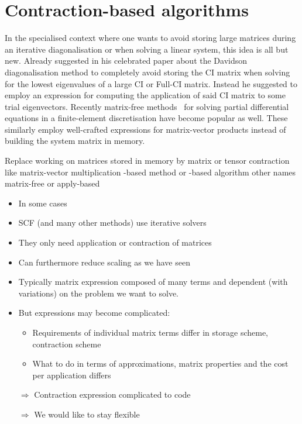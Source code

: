 \section{Contraction-based algorithms}
\label{sec:ContractionAlgos}

In the specialised context where one wants to avoid storing
large matrices during an iterative diagonalisation
or when solving a linear system,
this idea is all but new.
Already \citet{Davidson1975} suggested in his celebrated paper
about the Davidson diagonalisation method
to completely avoid storing the CI matrix when solving for the
lowest eigenvalues of a large CI or Full-CI matrix.
Instead he suggested to employ an expression for computing
the application of said CI matrix to some trial eigenvectors.
Recently matrix-free methods~\cite{Kronbichler2012}
for solving partial differential equations
in a finite-element discretisation
have become popular as well.
These similarly employ well-crafted expressions for matrix-vector
products instead of building the \FE system matrix in memory.



Replace working on matrices stored in memory
by matrix or tensor contraction
like matrix-vector multiplication
\contraction-based method or \contraction-based algorithm
other names matrix-free or apply-based

\begin{itemize}
	\item In some cases 
	\item SCF (and many other methods) use iterative solvers
	\item They only need application or contraction of matrices
	\item Can furthermore reduce scaling as we have seen
	\item Typically matrix expression composed of many terms and dependent (with variations) on the problem we want to solve.
	\item But expressions may become complicated:
		\begin{itemize}
			\item Requirements of individual matrix terms differ in storage scheme, contraction scheme
			\item What to do in terms of approximations, matrix properties and the cost per application differs
		\end{itemize}
	\item[$\Rightarrow$] Contraction expression complicated to code
	\item[$\Rightarrow$] We would like to stay flexible
\end{itemize}


